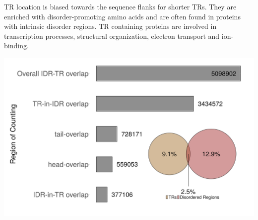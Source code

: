 \documentclass[widescreen,fleqn]{betterposter}
\begin{document}
{TR location is biased towards the sequence flanks for shorter TRs. They are enriched with disorder-promoting amino acids and are often found in proteins with intrinsic disorder regions.
TR containing proteins are involved in transcription processes, structural organization, electron transport
and ion-binding.

\begin{center}
    \includegraphics[width=0.4\textheight]{figures/TR_disorder_overlap_overall_detail_and_venn.png}
\end{center}

}
\end{document}
